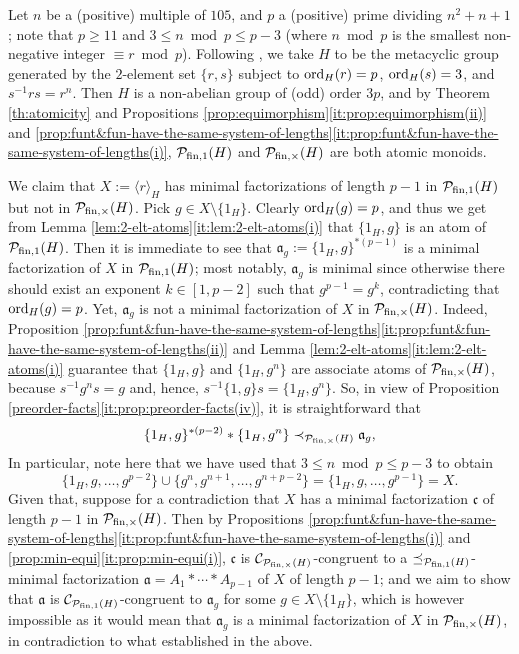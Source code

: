 \begin{eg}\label{exa:strict-inclusion}
	Let $n$ be a (positive) multiple of $105$, and $p$ a (positive) prime dividing $n^2 + n + 1$; note that $p \ge 11$ and $3 \le n \bmod p \le p-3$ (where $n \bmod p$ is the smallest non-negative integer $\equiv r \bmod p$). Following \cite[p. 27]{gorenstein80}, we take $H$ to be the metacyclic group generated by the $2$-element set $\{r, s\}$ subject to ${\operatorname{ord}}_H(r) = p$, ${\operatorname{ord}}_H(s) = 3$, and $s^{-1} r s = r^n$. 
	Then $H$ is a non-abelian group of (odd) order $3p$, and by Theorem \ref{th:atomicity} and Propositions \ref{prop:equimorphism}\ref{it:prop:equimorphism(ii)} and \ref{prop:funt&fun-have-the-same-system-of-lengths}\ref{it:prop:funt&fun-have-the-same-system-of-lengths(i)}, $\mathcal P_{\textrm{fin},1}(H)$ and $\mathcal P_{\textrm{fin},\times}(H)$ are both atomic monoids. 
	
We claim that $X := \langle r \rangle_H$ has minimal factorizations of length $p-1$ in $\mathcal P_{\textrm{fin},1}(H)$ but not in $\mathcal P_{\textrm{fin},\times}(H)$.
	{Pick $g \in X \setminus \{1_H\}$.} Clearly ${\operatorname{ord}}_H(g) = p$, and thus we get from Lemma \ref{lem:2-elt-atoms}\ref{it:lem:2-elt-atoms(i)} that $\{1_H, g\}$ is an atom of $\mathcal P_{\textrm{fin},1}(H)$. Then it is immediate to see that $\mathfrak a_g := \{1_H, g\}^{\ast (p-1)}$ is a minimal factorization of $X$ in $\mathcal P_{\textrm{fin},1}(H)$; most notably, $\mathfrak a_g$ is minimal since otherwise there should exist an exponent $k \in [ 1, p-2 ]$ such that $g^{p-1} = g^k$, contradicting that ${\operatorname{ord}}_H(g) = p$. Yet, $\mathfrak a_g$ is not a minimal factorization of $X$ in $\mathcal P_{\textrm{fin},\times}(H)$.
	Indeed, Proposition \ref{prop:funt&fun-have-the-same-system-of-lengths}\ref{it:prop:funt&fun-have-the-same-system-of-lengths(ii)} and Lemma \ref{lem:2-elt-atoms}\ref{it:lem:2-elt-atoms(i)} guarantee that $\{1_H, g\}$ and $\{1_H, g^n\}$ are associate atoms of $\mathcal P_{\textrm{fin},\times}(H)$, because $s^{-1} g^n s = g$ and, hence, $s^{-1} \{1, g\} s = \{1_H, g^n\}$. So, in view of Proposition \ref{preorder-facts}\ref{it:prop:preorder-facts(iv)}, it is straightforward that 
	\[
	\{1_H, g\}^{\ast (p-2)} \ast \{1_H, g^n\} \prec_{\mathcal P_{\textrm{fin},\times}(H)} \mathfrak a_g,
	\]
	In particular, note here that we have used that $3 \le n \bmod p \le p-3$ to obtain
	\[
	\{1_H, g, \ldots, g^{p-2}\} \cup \{g^n, g^{n+1}, \ldots, g^{n+p-2}\} = \{1_H, g, \ldots, g^{p-1}\} = X.
	\]
	Given that, suppose for a contradiction that $X$ has a minimal factorization $\mathfrak c$ of length $p-1$ in $\mathcal P_{\textrm{fin},\times}(H)$. Then by Propositions \ref{prop:funt&fun-have-the-same-system-of-lengths}\ref{it:prop:funt&fun-have-the-same-system-of-lengths(i)} and \ref{prop:min-equi}\ref{it:prop:min-equi(i)}, $\mathfrak c$ is $\mathcal{C}_{\mathcal P_{\textrm{fin},\times}(H)}$-congruent to a $\preceq_{\mathcal P_{\textrm{fin},1}(H)}$-minimal fac\-tor\-ization $\mathfrak a = A_1 \ast \cdots \ast A_{p-1}$ of $X$ of length $p-1$; and we aim to show that $\mathfrak a$ is $\mathcal{C}_{\mathcal P_{\textrm{fin},1}(H)}$-congruent to $\mathfrak a_g$ for some $g \in X \setminus \{1_H\}$, which is however impossible as it would mean that $\mathfrak a_g$ is a minimal factorization of $X$ in $\mathcal P_{\textrm{fin},\times}(H)$, in contradiction to what established in the above.
	

\end{eg}
